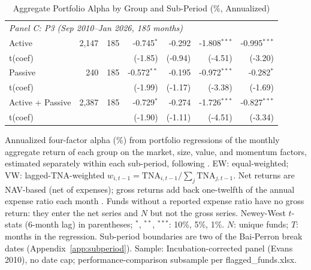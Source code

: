 \begin{table}[!htbp]
{\begin{tabular}[t]{lrrrrrr}
\hline
\multicolumn{7}{l}{\textit{Panel C: P3 (Sep 2010--Jan 2026, 185 months)}}\\
\hspace{1em}Active & 2,147 & 185 & -0.745$^{*}$ & -0.292 & -1.808$^{***}$ & -0.995$^{***}$\\
\hspace{1em}t(coef) &  &  & (-1.85) & (-0.94) & (-4.51) & (-3.20)\\
\hspace{1em}Passive & 240 & 185 & -0.572$^{**}$ & -0.195 & -0.972$^{***}$ & -0.282$^{*}$\\
\hspace{1em}t(coef) &  &  & (-1.99) & (-1.17) & (-3.38) & (-1.69)\\
\midrule
\hspace{1em}Active + Passive & 2,387 & 185 & -0.729$^{*}$ & -0.274 & -1.726$^{***}$ & -0.827$^{***}$\\
\hspace{1em}t(coef) &  &  & (-1.90) & (-1.11) & (-4.51) & (-3.34)\\
\bottomrule
\end{tabular}%
}\sbefit
\setlength{\tabletempwidth}{\wd\tabletempbox}
\ifdim\tabletempwidth>\linewidth\setlength{\tabletempwidth}{\linewidth}\fi
\begin{minipage}{\tabletempwidth}
\captionsetup{width=\linewidth}
\caption{\label{tab:subperiod_perf_aggregate}Aggregate Portfolio Alpha by Group and Sub-Period (\%, Annualized)}
\ifdim\wd\tabletempbox>\linewidth
  \resizebox{\linewidth}{!}{\usebox{\tabletempbox}}
\else
  \usebox{\tabletempbox}
\fi
\par\medskip
\begin{singlespace}\tablefont\noindent
Annualized \textcite{Carhart1997} four-factor alpha (\%) from portfolio regressions of the monthly aggregate return of each group on the market, size, value, and momentum factors, estimated separately within each sub-period, following \textcite{FamaFrench2010}. EW: equal-weighted; VW: lagged-TNA-weighted $w_{i,t-1} = \text{TNA}_{i,t-1} / \sum_j \text{TNA}_{j,t-1}$. Net returns are NAV-based (net of expenses); gross returns add back one-twelfth of the annual expense ratio each month \parencite{FamaFrench2010}. Funds without a reported expense ratio have no gross return: they enter the net series and $N$ but not the gross series. Newey-West $t$-stats (6-month lag) in parentheses; $^{*}$, $^{**}$, $^{***}$: 10\%, 5\%, 1\%. $N$: unique funds; $T$: months in the regression. Sub-period boundaries are two of the Bai-Perron break dates (Appendix~\ref{app:subperiod}). Sample: Incubation-corrected panel (Evans 2010), no date cap; performance-comparison subsample per flagged\_funds.xlsx.
\end{singlespace}
\end{minipage}
\end{table}

